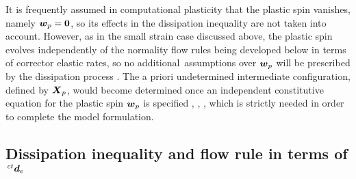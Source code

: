 \documentclass[preprint,review,12pt,sort&compress]{elsarticle}%
\renewcommand{\mathbf}[1]{\mbox{\boldmath $#1$ \unboldmath}  \!\!}
\begin{document}
It is frequently assumed in computational plasticity that the plastic spin
vanishes, namely $\mathbf{w}_{p}=\mathbf{0}$, so its effects in the
dissipation inequality are not taken into account. However, as in the small
strain case discussed above, the plastic spin evolves independently of the
normality flow rules being developed below in terms of corrector elastic
rates, so no additional\ assumptions over $\mathbf{w}_{p}$ will be prescribed
by the dissipation process \cite{Lubliner86}. The a priori undetermined
intermediate configuration, defined by $\mathbf{X}_{p}$, would become
determined once an independent constitutive equation for the plastic spin
$\mathbf{w}_{p}$ is specified \cite{Simo98}, \cite{MontansBathe07},
\cite{KimMontansBathe09}, which is strictly needed in order to complete the
model formulation.

\subsection{Dissipation inequality and flow rule in terms of $\,^{ct}%
\mathbf{d}_{e}$}
\end{document}
